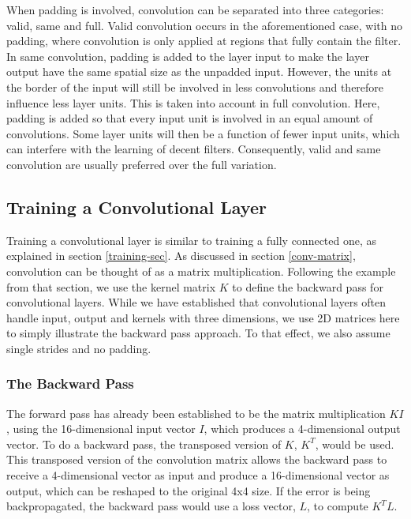 \noindent When padding is involved, convolution can be separated into three categories: valid, same and full. Valid convolution occurs in the aforementioned case, with no padding, where convolution is only applied at regions that fully contain the filter. In same convolution, padding is added to the layer input to make the layer output have the same spatial size as the unpadded input. However, the units at the border of the input will still be involved in less convolutions and therefore influence less layer units. This is taken into account in full convolution. Here, padding is added so that every input unit is involved in an equal amount of convolutions. Some layer units will then be a function of fewer input units, which can interfere with the learning of decent filters. Consequently, valid and same convolution are usually preferred over the full variation.

\subsection{Training a Convolutional Layer}

Training a convolutional layer is similar to training a fully connected one, as explained in section \ref{training-sec}. As discussed in section \ref{conv-matrix}, convolution can be thought of as a matrix multiplication. Following the example from that section, we use the kernel matrix $K$ to define the backward pass for convolutional layers. While we have established that convolutional layers often handle input, output and kernels with three dimensions, we use 2D matrices here to simply illustrate the backward pass approach. To that effect, we also assume single strides and no padding. 

\subsubsection{The Backward Pass}

The forward pass has already been established to be the matrix multiplication $KI$, using the 16-dimensional input vector $I$, which produces a 4-dimensional output vector. To do a backward pass, the transposed version of $K$, $K^T$, would be used. This transposed version of the convolution matrix allows the backward pass to receive a 4-dimensional vector as input and produce a 16-dimensional vector as output, which can be reshaped to the original 4x4 size. If the error is being backpropagated, the backward pass would use a loss vector, $L$, to compute $K^T L$. 

